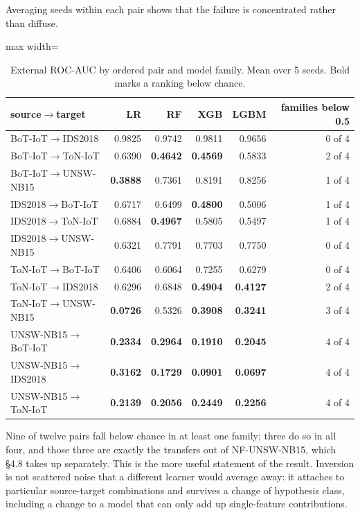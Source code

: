 \documentclass[preprint,12pt,nopreprintline]{elsarticle}
\begin{document}
Averaging seeds within each pair shows that the failure is concentrated rather than diffuse.

\begin{table}[htbp]\centering\scriptsize
\caption{External ROC-AUC by ordered pair and model family. Mean over 5 seeds. Bold marks a ranking below chance.}
\begin{adjustbox}{max width=\textwidth}\begin{tabular}{lrrrrr}
\toprule
source$\rightarrow$target & LR & RF & XGB & LGBM & families below 0.5 \\
\midrule
BoT-IoT$\rightarrow$IDS2018 & 0.9825 & 0.9742 & 0.9811 & 0.9656 & 0 of 4 \\
BoT-IoT$\rightarrow$ToN-IoT & 0.6390 & \textbf{0.4642} & \textbf{0.4569} & 0.5833 & 2 of 4 \\
BoT-IoT$\rightarrow$UNSW-NB15 & \textbf{0.3888} & 0.7361 & 0.8191 & 0.8256 & 1 of 4 \\
IDS2018$\rightarrow$BoT-IoT & 0.6717 & 0.6499 & \textbf{0.4800} & 0.5006 & 1 of 4 \\
IDS2018$\rightarrow$ToN-IoT & 0.6884 & \textbf{0.4967} & 0.5805 & 0.5497 & 1 of 4 \\
IDS2018$\rightarrow$UNSW-NB15 & 0.6321 & 0.7791 & 0.7703 & 0.7750 & 0 of 4 \\
ToN-IoT$\rightarrow$BoT-IoT & 0.6406 & 0.6064 & 0.7255 & 0.6279 & 0 of 4 \\
ToN-IoT$\rightarrow$IDS2018 & 0.6296 & 0.6848 & \textbf{0.4904} & \textbf{0.4127} & 2 of 4 \\
ToN-IoT$\rightarrow$UNSW-NB15 & \textbf{0.0726} & 0.5326 & \textbf{0.3908} & \textbf{0.3241} & 3 of 4 \\
UNSW-NB15$\rightarrow$BoT-IoT & \textbf{0.2334} & \textbf{0.2964} & \textbf{0.1910} & \textbf{0.2045} & 4 of 4 \\
UNSW-NB15$\rightarrow$IDS2018 & \textbf{0.3162} & \textbf{0.1729} & \textbf{0.0901} & \textbf{0.0697} & 4 of 4 \\
UNSW-NB15$\rightarrow$ToN-IoT & \textbf{0.2139} & \textbf{0.2056} & \textbf{0.2449} & \textbf{0.2256} & 4 of 4 \\
\bottomrule
\end{tabular}\end{adjustbox}
\end{table}

Nine of twelve pairs fall below chance in at least one family; three do so in all four, and those three are exactly the transfers out of NF-UNSW-NB15, which \S{}4.8 takes up separately. This is the more useful statement of the result. Inversion is not scattered noise that a different learner would average away: it attaches to particular source-target combinations and survives a change of hypothesis class, including a change to a model that can only add up single-feature contributions.
\end{document}
